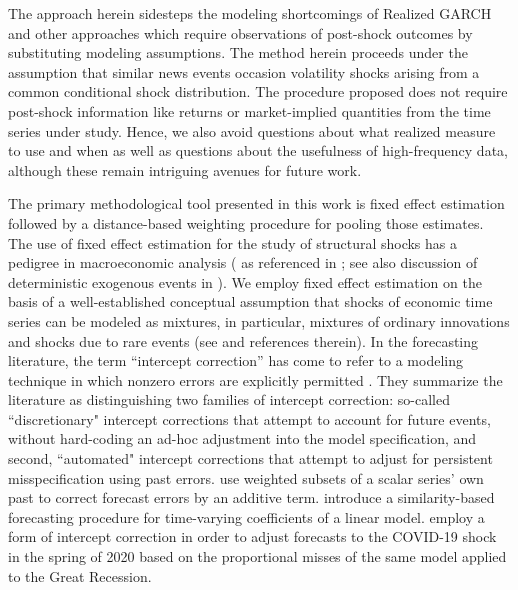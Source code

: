 \documentclass{uiucthesis2021}
\theoremstyle{definition}
\begin{document}
The approach herein sidesteps the modeling shortcomings of Realized GARCH and other approaches which require observations of post-shock outcomes
by substituting modeling assumptions.  The method herein proceeds under the assumption that similar news events occasion volatility shocks arising from a common conditional shock distribution.  The procedure proposed does not require post-shock information like returns or market-implied quantities from the time series under study.  Hence, we also avoid questions about what realized measure to use and when as well as questions about the usefulness of high-frequency data, although these remain intriguing avenues for future work.

The primary methodological tool presented in this work is fixed effect estimation followed by a distance-based weighting procedure for pooling those estimates.  The use of fixed effect estimation for the study of structural shocks has a pedigree in macroeconomic analysis (\cite[][]{romer1989does} as referenced in \cite[][]{kilian2017structural}; see also discussion of deterministic exogenous events in \cite[][]{engle2001good}).  We employ fixed effect estimation on the basis of a well-established conceptual assumption that shocks of economic time series can be modeled as mixtures, in particular, mixtures of ordinary innovations and shocks due to rare events (see \cite[][]{phillips1996forecasting} and references therein).  In the forecasting literature, the term ``intercept correction'' has come to refer to a modeling technique in which nonzero errors are explicitly permitted \parencite[][]{hendry1994theory, clements1998forecasting}.  They summarize the literature as distinguishing two families of intercept correction: so-called ``discretionary" intercept corrections that attempt to account for future events, without hard-coding an ad-hoc adjustment into the model specification, and second, ``automated" intercept corrections that attempt to adjust for persistent misspecification using past errors.  \cite[][]{guerron2017macroeconomic} use weighted subsets of a scalar series' own past to correct forecast errors by an additive term. \cite[][]{dendramis2020similarity} introduce a similarity-based forecasting procedure for time-varying coefficients of a linear model. \cite[][]{foroni2022forecasting} employ a form of intercept correction in order to adjust forecasts to the COVID-19 shock in the spring of 2020 based on the proportional misses of the same model applied to the Great Recession.
\end{document}
